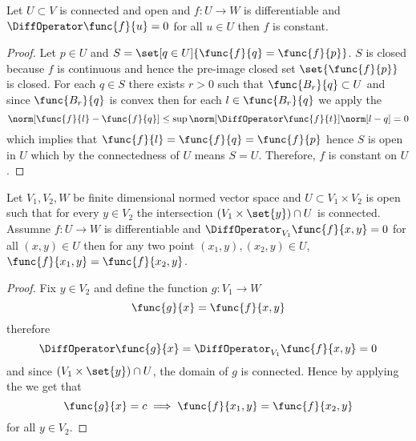\begin{corollary} \label{cr:derivativeZeroConstant}
    Let \(U \subset V\) is connected and open and \(f: U \to W\) is differentiable and \(\DiffOperator \func{f}{u} = 0\) for all \(u \in U\) then \(f\) is constant.
\end{corollary}

\begin{proof}
    Let \(p \in U\) and \( S = \set[q \in U]{\func{f}{q} = \func{f}{p}} \). \(S\) is closed because \(f\) is continuous and hence the pre-image closed set \(\set{\func{f}{p}}\) is closed. For each \(q \in S\) there exists \(r > 0\) such that \(\func{B_r}{q} \subset U\) and since \(\func{B_r}{q}\) is convex then for each \( l \in \func{B_r}{q}\) we apply the 
    \begin{equation*}
        \norm[\func{f}{l} - \func{f}{q}] \leq \sup \norm[\DiffOperator \func{f}{t}] \norm[l - q] = 0
    \end{equation*}
    which implies that \(\func{f}{l} = \func{f}{q} = \func{f}{p}\) hence \(S\) is open in \(U\) which by the connectedness of \(U\) means \(S = U\). Therefore, \(f\) is constant on \(U\).
\end{proof}

\begin{corollary}
    Let \(V_1, V_2, W\) be finite dimensional normed vector space and \(U \subset V_1 \times V_2\) is open such that for every \(y \in V_2\) the intersection \((V_1 \times \set{y}) \cap U\) is connected. Assumne \(f : U \to W\) is differentiable and \(\DiffOperator_{V_1} \func{f}{x,y} = 0\) for all \((x,y) \in U\) then for any two point \((x_1,y), (x_2,y) \in U\),\(\func{f}{x_1,y} = \func{f}{x_2,y}\).
\end{corollary}

\begin{proof}
    Fix \(y \in V_2\) and define the function \(g : V_1 \to W\)
    \begin{equation*}
        \func{g}{x} = \func{f}{x,y}
    \end{equation*}
    therefore
    \begin{equation*}
        \DiffOperator \func{g}{x} = \DiffOperator_{V_1} \func{f}{x,y} = 0
    \end{equation*}
    and since \((V_1 \times \set{y}) \cap U\), the domain of \(g\) is connected. Hence by applying the  we get that
    \begin{equation*}
        \func{g}{x} = c \implies \func{f}{x_1,y} = \func{f}{x_2,y}
    \end{equation*}
    for all \(y \in V_2\).
\end{proof}

